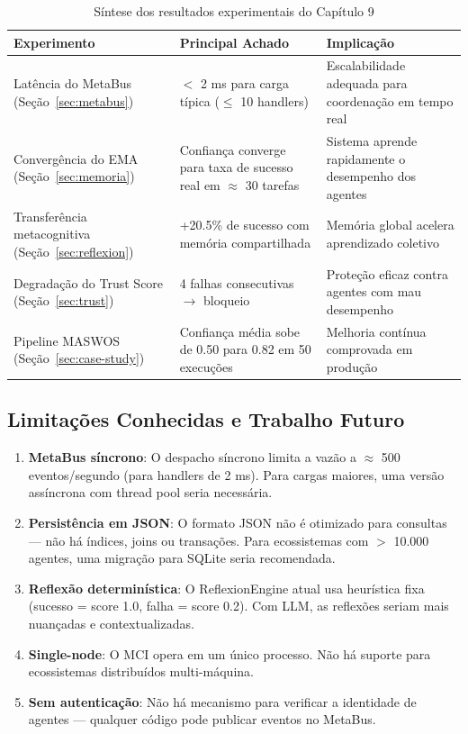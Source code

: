 \begin{table}[htbp]
\centering
\caption{Síntese dos resultados experimentais do Capítulo 9}
\label{tab:experiments-summary}
\begin{tabular}{@{}p{3.5cm}p{4.5cm}p{5cm}@{}}
\toprule
\textbf{Experimento} & \textbf{Principal Achado} & \textbf{Implicação} \\
\midrule
Latência do MetaBus (Seção~\ref{sec:metabus}) & $<$ 2 ms para carga típica ($\leq$ 10 handlers) & Escalabilidade adequada para coordenação em tempo real \\
Convergência do EMA (Seção~\ref{sec:memoria}) & Confiança converge para taxa de sucesso real em $\approx$ 30 tarefas & Sistema aprende rapidamente o desempenho dos agentes \\
Transferência metacognitiva (Seção~\ref{sec:reflexion}) & +20.5\% de sucesso com memória compartilhada & Memória global acelera aprendizado coletivo \\
Degradação do Trust Score (Seção~\ref{sec:trust}) & 4 falhas consecutivas $\rightarrow$ bloqueio & Proteção eficaz contra agentes com mau desempenho \\
Pipeline MASWOS (Seção~\ref{sec:case-study}) & Confiança média sobe de 0.50 para 0.82 em 50 execuções & Melhoria contínua comprovada em produção \\
\bottomrule
\end{tabular}
\end{table}

\subsection{Limitações Conhecidas e Trabalho Futuro}

\begin{enumerate}
    \item \textbf{MetaBus síncrono}: O despacho síncrono limita a vazão a $\approx$ 500 eventos/segundo (para handlers de 2 ms). Para cargas maiores, uma versão assíncrona com thread pool seria necessária.
    
    \item \textbf{Persistência em JSON}: O formato JSON não é otimizado para consultas — não há índices, joins ou transações. Para ecossistemas com $>$ 10.000 agentes, uma migração para SQLite seria recomendada.
    
    \item \textbf{Reflexão determinística}: O ReflexionEngine atual usa heurística fixa (sucesso = score 1.0, falha = score 0.2). Com LLM, as reflexões seriam mais nuançadas e contextualizadas.
    
    \item \textbf{Single-node}: O MCI opera em um único processo. Não há suporte para ecossistemas distribuídos multi-máquina.
    
    \item \textbf{Sem autenticação}: Não há mecanismo para verificar a identidade de agentes — qualquer código pode publicar eventos no MetaBus.
\end{enumerate}

